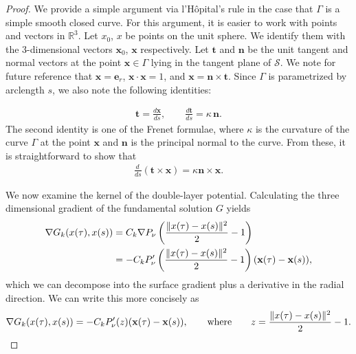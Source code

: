 \begin{proof}
We provide a simple argument via l'H\^{o}pital's rule in the case that
$\Gamma$ is a simple smooth closed curve. For this argument, it is
easier  to work with points and vectors in $\mathbb{R}^3$.  Let $x_{0}$,
$x$ be points on the unit sphere. We identify them with the
3-dimensional vectors $\mathbf{x}_{0}$, $\mathbf{x}$ respectively.  Let
$\mathbf{t}$ and $\mathbf{n}$ be the unit tangent and normal vectors at
the point $\mathbf{x} \in \Gamma$ lying in the tangent plane of
$\mathcal{S}$.  We note for future reference that
$\mathbf{x}=\mathbf{e}_{r}$, $\mathbf{x} \cdot \mathbf{x} = 1$, and
$\mathbf{x}=\mathbf{n} \times \mathbf{t}$. Since $\Gamma$ is
parametrized by arclength $s$, we also note the following identities:

\begin{align*}
  \mathbf{t} = \frac{d\mathbf{x}}{ds}, \qquad 
  \frac{d\mathbf{t}}{ds} = \kappa \, \mathbf{n}.
\end{align*}
The second identity is one of the Frenet formulae, where $\kappa$ is the
curvature of the curve $\Gamma$ at the point $\mathbf{x}$ and
$\mathbf{n}$ is the principal normal to the curve.  From these, it is
straightforward to show that 
\begin{align*}
  \frac{d \, }{ds} \left( \mathbf{t} \times \mathbf{x} \right)=
  \kappa \mathbf{n} \times \mathbf{x} . 
\end{align*}

We now examine the kernel of the double-layer potential. Calculating the
three dimensional gradient of the fundamental solution $G$ yields
\begin{align*}
  \nabla G_k(x(\tau),x(s)) &= C_k \nabla P_\nu\left(
    \frac{\|x(\tau)-x(s)\|^2}{2}-1\right) \\
  &=-C_k P'_\nu\left(\frac{\|x(\tau)-x(s)\|^2}{2}-1\right)
    (\mathbf{x}(\tau)-\mathbf{x}(s)),
\end{align*}
which we can decompose into the surface gradient plus a derivative in
the radial direction. We can write this more concisely as
\begin{align*}
  \nabla G_{k}(x(\tau),x(s))=-C_k P'_{\nu}(z) (\mathbf{x}(\tau)-\mathbf{x}(s)), 
  \qquad \mbox{where}\qquad z=\frac{\|{ x}(\tau)-{x}(s)\|^2}{2}-1.
\end{align*} 


\end{proof}
